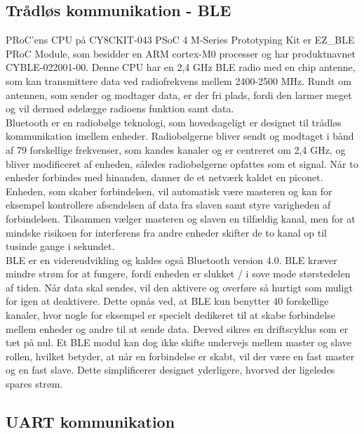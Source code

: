 \subsection{Trådløs kommunikation - BLE} 
PRoC'ens CPU på CY8CKIT-043 PSoC 4 M-Series Prototyping Kit er EZ_BLE PRoC Module, som besidder en ARM cortex-M0 processer og har produktnavnet CYBLE-022001-00. Denne CPU har en 2,4 GHz BLE radio med en chip antenne, som kan transmittere data ved radiofrekvens mellem 2400-2500 MHz. Rundt om antennen, som sender og modtager data, er der fri plads, fordi den larmer meget og vil dermed ødelægge radioens funktion samt data. \citep{Semiconductor2016PRoC,Semiconductor2016BLEdyb}\\
Bluetooth er en radiobølge teknologi, som hovedsageligt er designet til trådløs kommunikation imellem enheder. Radiobølgerne bliver sendt og modtaget i bånd af 79 forskellige frekvenser, som kandes kanaler og er centreret om 2,4 GHz, og bliver modificeret af enheden, således radiobølgerne opfattes som et signal. Når to enheder forbindes med hinanden, danner de et netværk kaldet en piconet. Enheden, som skaber forbindelsen, vil automatisk være masteren og kan for eksempel kontrollere afsendelsen af data fra slaven samt styre varigheden af forbindelsen. Tilsammen vælger masteren og slaven en tilfældig kanal, men for at mindske risikoen for interferens fra andre enheder skifter de to kanal op til tusinde gange i sekundet. \citep{Sauter2011} \\
BLE er en videreudvikling og kaldes også Bluetooth version 4.0. BLE kræver mindre strøm for at fungere, fordi enheden er slukket / i sove mode størstedelen af tiden. Når data skal sendes, vil den aktivere og overføre så hurtigt som muligt for igen at deaktivere. Dette opnås ved, at BLE kun benytter 40 forskellige kanaler, hvor nogle for eksempel er specielt dedikeret til at skabe forbindelse mellem enheder og andre til at sende data. Derved sikres en driftscyklus som er tæt på nul. Et BLE modul kan dog ikke skifte undervejs mellem master og slave rollen, hvilket betyder, at når en forbindelse er skabt, vil der være en fast master og en fast slave. Dette simplificerer designet yderligere, hvorved der ligeledes spares strøm. \citep{Gupta2013}

\subsection{UART kommunikation} %
%
%
%
%
